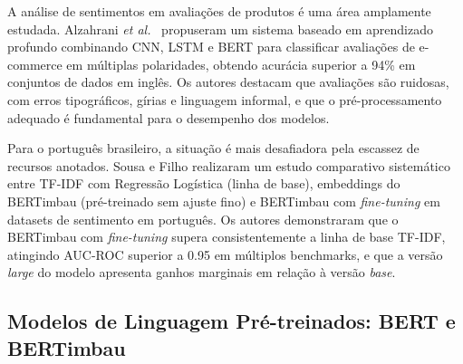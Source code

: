 \documentclass{IEEEtran}
\begin{document}
A análise de sentimentos em avaliações de produtos é uma área amplamente estudada. Alzahrani \textit{et al.}~\cite{alzahrani2022intelligent} propuseram um sistema baseado em aprendizado profundo combinando CNN, LSTM e BERT para classificar avaliações de e-commerce em múltiplas polaridades, obtendo acurácia superior a 94\% em conjuntos de dados em inglês. Os autores destacam que avaliações são ruidosas, com erros tipográficos, gírias e linguagem informal, e que o pré-processamento adequado é fundamental para o desempenho dos modelos.


Para o português brasileiro, a situação é mais desafiadora pela escassez de recursos anotados. Sousa e Filho\cite{souza2022bert} realizaram um estudo comparativo sistemático entre TF-IDF com Regressão Logística (linha de base), embeddings do BERTimbau (pré-treinado sem ajuste fino) e BERTimbau com \textit{fine-tuning} em datasets de sentimento em português. Os autores demonstraram que o BERTimbau com \textit{fine-tuning} supera consistentemente a linha de base TF-IDF, atingindo AUC-ROC superior a 0.95 em múltiplos benchmarks, e que a versão \textit{large} do modelo apresenta ganhos marginais em relação à versão \textit{base}.


\subsection{Modelos de Linguagem Pré-treinados: BERT e BERTimbau}
\end{document}
